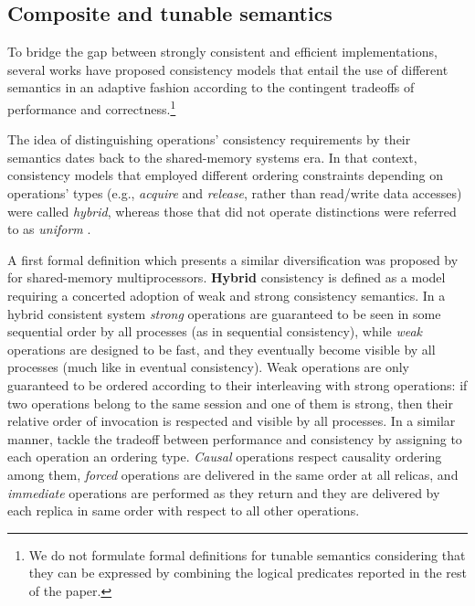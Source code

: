 \documentclass[letter, 11pt]{article}
\newcommand{\citeN}{\citet}
\renewcommand{\cite}{\citep}
\begin{document}
\subsection{Composite and tunable semantics}
\label{subsec:tunable}
To bridge the gap between strongly consistent and efficient implementations, several works have proposed consistency models that entail the use of different semantics in an adaptive fashion 
according to the contingent tradeoffs of performance and correctness.\footnote{We do not formulate formal definitions for tunable semantics considering that they can be expressed by combining the logical predicates reported in the rest of the paper.}

The idea of distinguishing operations' consistency requirements by their semantics dates back to 
the shared-memory systems era.
In that context, consistency models that employed different ordering constraints depending
on operations' types (e.g., \emph{acquire} and \emph{release}, rather than read/write data accesses) 
were called \emph{hybrid}, whereas those that did not operate distinctions were referred to as
\emph{uniform} \cite{Mosberger:93,Dubois.Scheurich.ea:86,Gharachorloo.Lenoski.ea:90}.

A first formal definition which presents a similar diversification was proposed by 
\citeN{Attiya.Friedman:92} for shared-memory multiprocessors.
\textbf{Hybrid} consistency is defined as a model requiring a concerted adoption 
of weak and strong consistency semantics.
In a hybrid consistent system \emph{strong} operations are guaranteed to be seen 
in some sequential order by all processes (as in sequential consistency), 
while \emph{weak} operations are designed to be fast, and they eventually become visible by all processes
(much like in eventual consistency).
Weak operations are only guaranteed to be ordered according to their interleaving with strong operations:
if two operations belong to the same session and one of them is strong, 
then their relative order of invocation is respected and visible by all processes. 
In a similar manner, \citeN{Ladin.ea:92} tackle the tradeoff between performance and consistency 
by assigning to each operation an ordering type.
\emph{Causal} operations respect causality ordering among them,
\emph{forced} operations are delivered in the same order at all relicas, 
and \emph{immediate} operations are performed as they return and they are delivered by each replica in same order with respect to all other operations.
\end{document}
